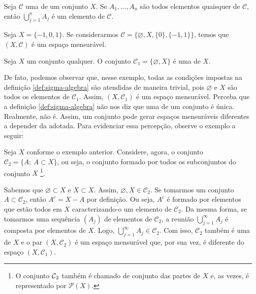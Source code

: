 \begin{remark}
\label{obs:sigma-união-finita}
    Seja $\mathcal{C}$ uma \sigal de um conjunto $X$. Se $A_1, ..., A_n$ são todos elementos quaisquer de $\mathcal{C}$, então $\displaystyle \bigcup_{j = 1}^n A_j$ é um elemento de $\mathcal{C}$.
\end{remark}

\begin{example}
    Seja $X = \{-1,0,1\}$. Se considerarmos $\mathcal{C} = \{\varnothing, X, \{0\}, \{-1,1\}\}$, temos que $(X, \mathcal{C})$ é um espaço mensurável.
\end{example}

\begin{example}
\label{ex:sigma-trivial}
    Seja $X$ um conjunto qualquer.
    O conjunto $\mathcal{C}_1 = \{\varnothing, X\}$ é uma \sigal de $X$.
\end{example}

De fato, podemos observar que, nesse exemplo, todas as condições impostas na definição \ref{def:sigma-algebra} são atendidas de maneira trivial, pois 
$\varnothing$ e $X$ são todos os elementos de $\mathcal{C}_1$. 
Assim,  $(X, \mathcal{C}_1)$ é um espaço mensurável.
%
Perceba que a definição \ref{def:sigma-algebra} não nos diz que uma \sigal de um conjunto é única.
Realmente, não é. 
Assim, um conjunto pode gerar espaços mensuráveis diferentes a depender da \sigal adotada.
Para evidenciar essa percepção, observe o exemplo a seguir:

\begin{example}
	\label{ex:sigma-subconjuntos}
	Seja $X$ conforme o exemplo anterior.
	Considere, agora, o conjunto $\mathcal{C}_2 = \{ A; \ A \subset X\}$, ou seja, o conjunto formado por todos os subconjuntos do conjunto $X$
	\footnote{O conjunto $\operatorname{\mathcal{C}}_2$ também é chamado de conjunto das partes de $X$ e, as vezes, é representado por $\mathcal{P}(X)$.}.
\end{example}

Sabemos que $\varnothing \subset X$ e $X \subset X$. 
Assim, $\varnothing, X \in \mathcal{C}_2$. 
Se tomarmos um conjunto $A \subset \mathcal{C}_2$, então $A^c = X - A$ por definição.
Ou seja, $A^c$ é formado por elementos que estão todos em $X$ caracterizando-o um elemento de $\mathcal{C}_2$.
Da mesma forma, se tomarmos uma sequência $(A_j)$ de elementos de $\mathcal{C}_2$, a reunião 
$\displaystyle \bigcup_{j = 1}^\infty A_j$ é composta por elementos de $X$.
Logo,  $\displaystyle \bigcup_{j = 1}^\infty A_j \in \mathcal{C}_2$.
Com isso, $\mathcal{C}_2$ também é uma \sigal de $X$ e o par $(X, \mathcal{C}_2)$ é um espaço mensurável que, por sua vez, é diferente do espaço $(X,\mathcal{C}_1)$.


